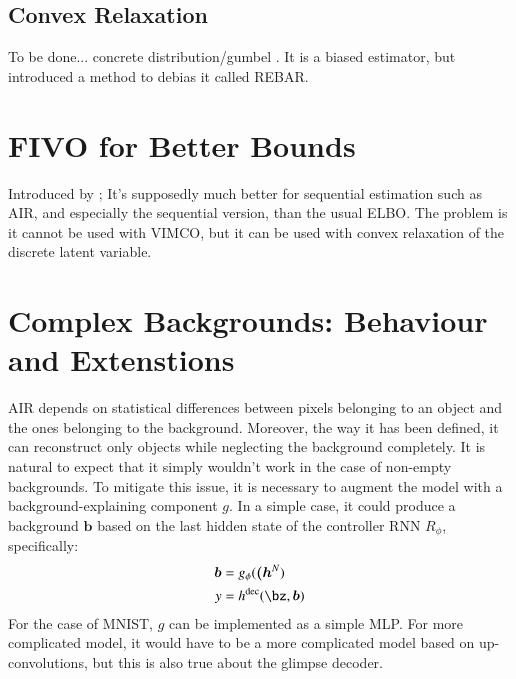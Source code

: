 \documentclass[]{article}
\begin{document}
    \subsection{Convex Relaxation}
        To be done... concrete distribution/gumbel \cite{Maddison2016,Jang2016}. It is a biased estimator, but \cite{Tucker2017} introduced a method to debias it called REBAR. 
        
\section{FIVO for Better Bounds}
\label{sec:fivo}
    Introduced by \cite{Maddison2017}; It's supposedly much better for sequential estimation such as AIR, and especially the sequential version, than the usual ELBO. The problem is it cannot be used with VIMCO, but it can be used with convex relaxation of the discrete latent variable.
        
\section{Complex Backgrounds: Behaviour and Extenstions}

    AIR depends on statistical differences between pixels belonging to an object and the ones belonging to the background. Moreover, the way it has been defined, it can reconstruct only objects while neglecting the background completely. It is natural to expect that it simply wouldn't work in the case of non-empty backgrounds. To mitigate this issue, it is necessary to augment the model with a background-explaining component $g$. In a simple case, it could produce a background $\bm{b}$ based on the last hidden state of the controller RNN $R_\phi$, specifically:
    \begin{align}
        \bm{b} &= g_\phi( \bm{(h}^N )\\
        y &= h^{\mathrm{dec}}( \bz, \bm{b})
    \end{align}
    For the case of MNIST, $g$ can be implemented as a simple MLP. For more complicated model, it would have to be a more complicated model based on up-convolutions, but this is also true about the glimpse decoder.
    

    
	\printbibliography
\end{document}
